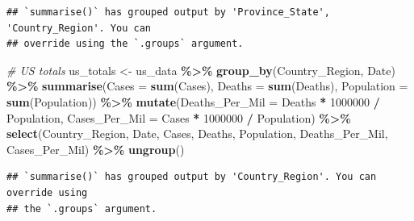 \documentclass[
]{article}
\newenvironment{Shaded}{\begin{snugshade}}{\end{snugshade}}
\newcommand{\AttributeTok}[1]{\textcolor[rgb]{0.13,0.29,0.53}{#1}}
\newcommand{\CommentTok}[1]{\textcolor[rgb]{0.56,0.35,0.01}{\textit{#1}}}
\newcommand{\DecValTok}[1]{\textcolor[rgb]{0.00,0.00,0.81}{#1}}
\newcommand{\FunctionTok}[1]{\textcolor[rgb]{0.13,0.29,0.53}{\textbf{#1}}}
\newcommand{\NormalTok}[1]{#1}
\newcommand{\OtherTok}[1]{\textcolor[rgb]{0.56,0.35,0.01}{#1}}
\newcommand{\SpecialCharTok}[1]{\textcolor[rgb]{0.81,0.36,0.00}{\textbf{#1}}}
\begin{document}
\begin{verbatim}
## `summarise()` has grouped output by 'Province_State', 'Country_Region'. You can
## override using the `.groups` argument.
\end{verbatim}

\begin{Shaded}
\begin{Highlighting}[]
\CommentTok{\# US totals}
\NormalTok{us\_totals }\OtherTok{\textless{}{-}}\NormalTok{ us\_data }\SpecialCharTok{\%\textgreater{}\%}
  \FunctionTok{group\_by}\NormalTok{(Country\_Region, Date) }\SpecialCharTok{\%\textgreater{}\%}
  \FunctionTok{summarise}\NormalTok{(}\AttributeTok{Cases =} \FunctionTok{sum}\NormalTok{(Cases), }\AttributeTok{Deaths =} \FunctionTok{sum}\NormalTok{(Deaths), }\AttributeTok{Population =} \FunctionTok{sum}\NormalTok{(Population)) }\SpecialCharTok{\%\textgreater{}\%}
  \FunctionTok{mutate}\NormalTok{(}\AttributeTok{Deaths\_Per\_Mil =}\NormalTok{ Deaths }\SpecialCharTok{*} \DecValTok{1000000} \SpecialCharTok{/}\NormalTok{ Population,}
         \AttributeTok{Cases\_Per\_Mil =}\NormalTok{ Cases }\SpecialCharTok{*} \DecValTok{1000000} \SpecialCharTok{/}\NormalTok{ Population) }\SpecialCharTok{\%\textgreater{}\%}
  \FunctionTok{select}\NormalTok{(Country\_Region, Date, Cases, Deaths, Population, Deaths\_Per\_Mil, Cases\_Per\_Mil) }\SpecialCharTok{\%\textgreater{}\%}
  \FunctionTok{ungroup}\NormalTok{()}
\end{Highlighting}
\end{Shaded}

\begin{verbatim}
## `summarise()` has grouped output by 'Country_Region'. You can override using
## the `.groups` argument.
\end{verbatim}
\end{document}
